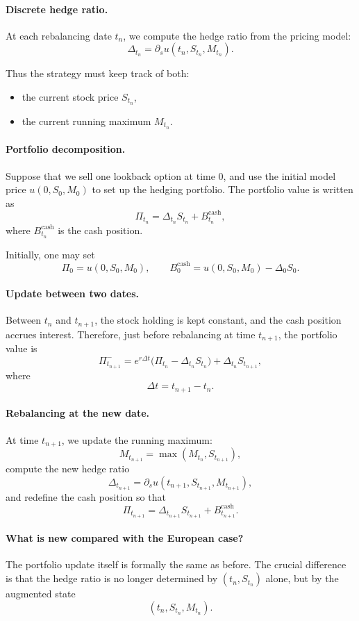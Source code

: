 \documentclass[11pt]{article}
\theoremstyle{plain}
\theoremstyle{definition}
\theoremstyle{remark}
\begin{document}
\paragraph{Discrete hedge ratio.}
At each rebalancing date \(t_n\), we compute the hedge ratio from the
pricing model:
\[
\Delta_{t_n}
=
\partial_s u(t_n,S_{t_n},M_{t_n}).
\]

Thus the strategy must keep track of both:
\begin{itemize}[leftmargin=1.4em]
    \item the current stock price \(S_{t_n}\),
    \item the current running maximum \(M_{t_n}\).
\end{itemize}

\paragraph{Portfolio decomposition.}
Suppose that we sell one lookback option at time \(0\), and use the
initial model price \(u(0,S_0,M_0)\) to set up the hedging portfolio.
The portfolio value is written as
\[
\Pi_{t_n}
=
\Delta_{t_n}S_{t_n}
+
B_{t_n}^{\mathrm{cash}},
\]
where \(B_{t_n}^{\mathrm{cash}}\) is the cash position.

Initially, one may set
\[
\Pi_0=u(0,S_0,M_0),
\qquad
B_0^{\mathrm{cash}}
=
u(0,S_0,M_0)-\Delta_0 S_0.
\]

\paragraph{Update between two dates.}
Between \(t_n\) and \(t_{n+1}\), the stock holding is kept constant, and
the cash position accrues interest.
Therefore, just before rebalancing at time \(t_{n+1}\), the portfolio
value is
\[
\Pi_{t_{n+1}}^{-}
=
e^{r\Delta t}
\big(\Pi_{t_n}-\Delta_{t_n}S_{t_n}\big)
+
\Delta_{t_n}S_{t_{n+1}},
\]
where
\[
\Delta t=t_{n+1}-t_n.
\]

\paragraph{Rebalancing at the new date.}
At time \(t_{n+1}\), we update the running maximum:
\[
M_{t_{n+1}}=\max(M_{t_n},S_{t_{n+1}}),
\]
compute the new hedge ratio
\[
\Delta_{t_{n+1}}=\partial_s u(t_{n+1},S_{t_{n+1}},M_{t_{n+1}}),
\]
and redefine the cash position so that
\[
\Pi_{t_{n+1}}
=
\Delta_{t_{n+1}}S_{t_{n+1}}
+
B_{t_{n+1}}^{\mathrm{cash}}.
\]

\paragraph{What is new compared with the European case?}
The portfolio update itself is formally the same as before.
The crucial difference is that the hedge ratio is no longer determined
by \((t_n,S_{t_n})\) alone, but by the augmented state
\[
(t_n,S_{t_n},M_{t_n}).
\]
\end{document}
